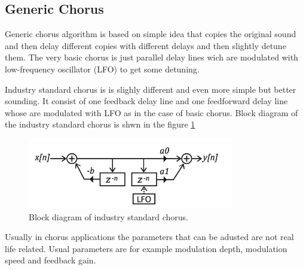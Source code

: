 \subsection{Generic Chorus}

Generic chorus algorithm is based on simple idea that copies the original sound and then delay
different copies with different delays and then slightly detune them. The very basic chorus is just
parallel delay lines wich are modulated with low-frequency oscillator (LFO) to get some detuning.

Industry standard chorus is is slighly different and even more simple but better sounding. It consist
of one feedback delay line and one feedforward delay line whose are modulated with LFO as in the 
case of basic chorus. Block diagram of the industry standard chorus is shwn in the figure \ref{fig_inds}
\begin{figure}[ht]
\centering
\includegraphics[width = 9cm]{industryStd.png}
\caption{Block diagram of industry standard chorus. \cite{dudas}}
\label{fig_inds}
\end{figure} 

Usually in chorus applications the parameters that can be adusted are not real life related.
Usual parameters are for example modulation depth, modulation speed and feedback gain.
